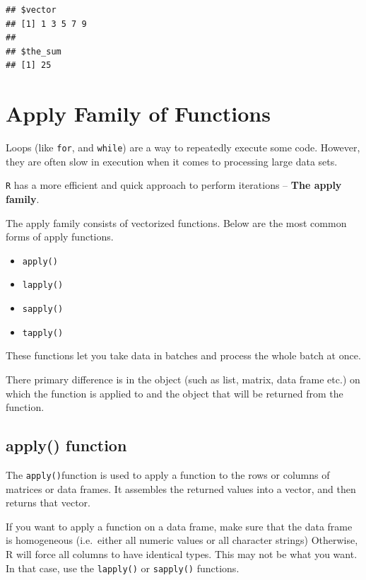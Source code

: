 \documentclass[
]{book}
\providecommand{\tightlist}{%
  \setlength{\itemsep}{0pt}\setlength{\parskip}{0pt}}
\begin{document}
\begin{verbatim}
## $vector
## [1] 1 3 5 7 9
## 
## $the_sum
## [1] 25
\end{verbatim}

\hypertarget{apply-family-of-functions}{%
\chapter{Apply Family of Functions}\label{apply-family-of-functions}}

Loops (like \texttt{for}, and \texttt{while}) are a way to repeatedly execute some code. However, they are often slow in execution when it comes to processing large data sets.

\texttt{R} has a more efficient and quick approach to perform iterations -- \textbf{The apply family}.

The apply family consists of vectorized functions. Below are the most common forms of apply functions.

\begin{itemize}
\tightlist
\item
  \texttt{apply()}
\item
  \texttt{lapply()}
\item
  \texttt{sapply()}
\item
  \texttt{tapply()}
\end{itemize}

These functions let you take data in batches and process the whole batch at once.

There primary difference is in the object (such as list, matrix, data frame etc.) on which the function is applied to and the object that will be returned from the function.

\hypertarget{apply-function}{%
\section{apply() function}\label{apply-function}}

The \texttt{apply()}function is used to apply a function to the rows or columns of matrices or data frames. It assembles the returned values into a vector, and then returns that vector.

If you want to apply a function on a data frame, make sure that the data frame is homogeneous (i.e.~either all numeric values or all character strings) Otherwise, R will force all columns to have identical types. This may not be what you want. In that case, use the \texttt{lapply()} or \texttt{sapply()} functions.
\end{document}
